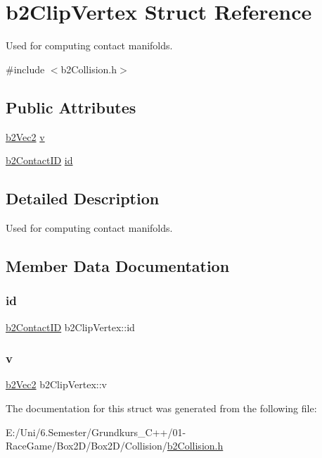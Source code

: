 \hypertarget{structb2_clip_vertex}{}\section{b2\+Clip\+Vertex Struct Reference}
\label{structb2_clip_vertex}


Used for computing contact manifolds.  




{\ttfamily \#include $<$b2\+Collision.\+h$>$}

\subsection*{Public Attributes}
\begin{DoxyCompactItemize}
\item 
\mbox{\hyperlink{structb2_vec2}{b2\+Vec2}} \mbox{\hyperlink{structb2_clip_vertex_a6c8d8e4c0667755d5295a9c0d91d5b87}{v}}
\item 
\mbox{\hyperlink{unionb2_contact_i_d}{b2\+Contact\+ID}} \mbox{\hyperlink{structb2_clip_vertex_ac0f6d48eafc40a665bc18d4aa821689d}{id}}
\end{DoxyCompactItemize}


\subsection{Detailed Description}
Used for computing contact manifolds. 

\subsection{Member Data Documentation}
\mbox{\label{structb2_clip_vertex_ac0f6d48eafc40a665bc18d4aa821689d}} 
\subsubsection{\texorpdfstring{id}{id}}
{\footnotesize\ttfamily \mbox{\hyperlink{unionb2_contact_i_d}{b2\+Contact\+ID}} b2\+Clip\+Vertex\+::id}

\mbox{\label{structb2_clip_vertex_a6c8d8e4c0667755d5295a9c0d91d5b87}} 
\subsubsection{\texorpdfstring{v}{v}}
{\footnotesize\ttfamily \mbox{\hyperlink{structb2_vec2}{b2\+Vec2}} b2\+Clip\+Vertex\+::v}



The documentation for this struct was generated from the following file\+:\begin{DoxyCompactItemize}
\item 
E\+:/\+Uni/6.\+Semester/\+Grundkurs\+\_\+\+C++/01-\/\+Race\+Game/\+Box2\+D/\+Box2\+D/\+Collision/\mbox{\hyperlink{b2_collision_8h}{b2\+Collision.\+h}}\end{DoxyCompactItemize}
